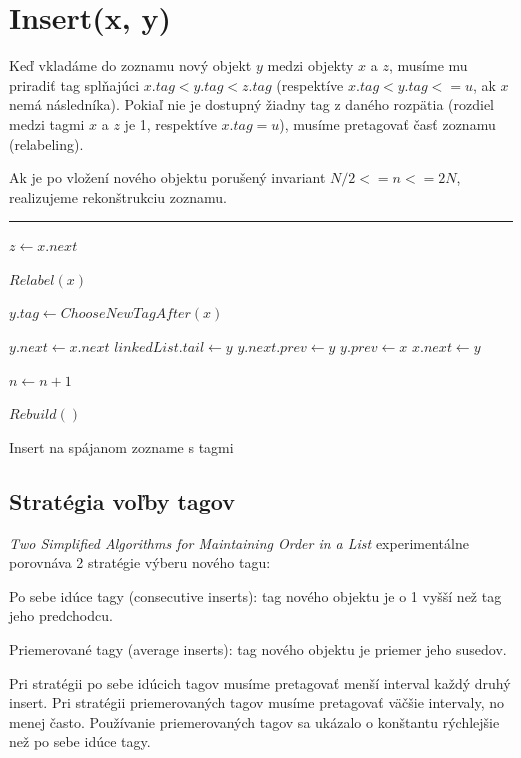 \documentclass[
  digital,     %
  oneside,     %
  nosansbold,  %
  nocolorbold, %
  lof,         %
  lot,         %
]{fithesis4}
\begin{document}
\section{Insert(x, y)}

Keď vkladáme do zoznamu nový objekt $y$ medzi objekty $x$ a $z$, musíme mu priradiť tag splňajúci $x.tag < y.tag < z.tag$ (respektíve $x.tag < y.tag <= u$, ak $x$ nemá následníka).
Pokiaľ nie je dostupný žiadny tag z daného rozpätia (rozdiel medzi tagmi $x$ a $z$ je 1, respektíve $x.tag = u$), musíme pretagovať časť zoznamu (relabeling).

Ak je po vložení nového objektu porušený invariant $N/2 <= n <= 2N$, realizujeme rekonštrukciu zoznamu.

\begin{algorithm}
\hrule\vspace{0.2em}
$z \leftarrow x.next$\;

{
    $Relabel(x)$\;
}

$y.tag \leftarrow ChooseNewTagAfter(x)$\;

$y.next \leftarrow x.next$\;
{
    $linkedList.tail \leftarrow y$\;
}
\Else
{
    $y.next.prev \leftarrow y$\;
}
$y.prev \leftarrow x$\;
$x.next \leftarrow y$\;


$n \leftarrow n + 1$\;

{
    $Rebuild()$\;
}
\caption{Insert na spájanom zozname s tagmi}
\end{algorithm}

\subsection*{Stratégia voľby tagov}

\textit{Two Simplified Algorithms for Maintaining Order in a List} \cite{paper1_ordered_list} experimentálne porovnáva 2 stratégie výberu nového tagu:
\begin{compactenum}
  \item Po sebe idúce tagy (consecutive inserts): tag nového objektu je o 1 vyšší než tag jeho predchodcu.
  \item Priemerované tagy (average inserts): tag nového objektu je priemer jeho susedov.
\end{compactenum}
Pri stratégii po sebe idúcich tagov musíme pretagovať menší interval každý druhý insert. Pri stratégii priemerovaných tagov musíme pretagovať väčšie intervaly, no menej často. Používanie priemerovaných tagov sa ukázalo o konštantu rýchlejšie než po sebe idúce tagy.
\end{document}
